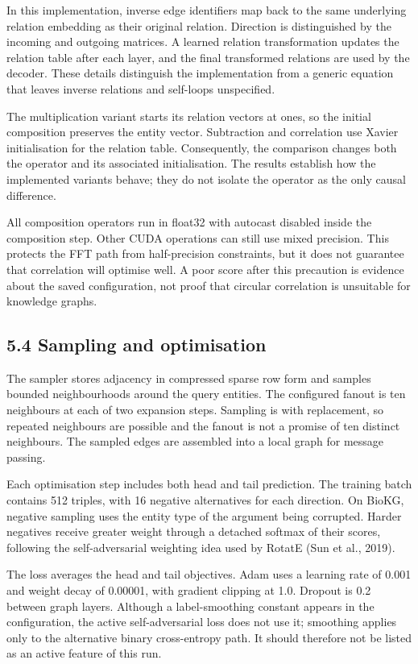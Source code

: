 \documentclass[11pt]{article}
\begin{document}
In this implementation, inverse edge identifiers map back to the same underlying relation embedding as their original relation. Direction is distinguished by the incoming and outgoing matrices. A learned relation transformation updates the relation table after each layer, and the final transformed relations are used by the decoder. These details distinguish the implementation from a generic equation that leaves inverse relations and self-loops unspecified.

The multiplication variant starts its relation vectors at ones, so the initial composition preserves the entity vector. Subtraction and correlation use Xavier initialisation for the relation table. Consequently, the comparison changes both the operator and its associated initialisation. The results establish how the implemented variants behave; they do not isolate the operator as the only causal difference.

All composition operators run in float32 with autocast disabled inside the composition step. Other CUDA operations can still use mixed precision. This protects the FFT path from half-precision constraints, but it does not guarantee that correlation will optimise well. A poor score after this precaution is evidence about the saved configuration, not proof that circular correlation is unsuitable for knowledge graphs.

\subsection*{5.4 Sampling and optimisation}
The sampler stores adjacency in compressed sparse row form and samples bounded neighbourhoods around the query entities. The configured fanout is ten neighbours at each of two expansion steps. Sampling is with replacement, so repeated neighbours are possible and the fanout is not a promise of ten distinct neighbours. The sampled edges are assembled into a local graph for message passing.

Each optimisation step includes both head and tail prediction. The training batch contains 512 triples, with 16 negative alternatives for each direction. On BioKG, negative sampling uses the entity type of the argument being corrupted. Harder negatives receive greater weight through a detached softmax of their scores, following the self-adversarial weighting idea used by RotatE (Sun et al., 2019).

The loss averages the head and tail objectives. Adam uses a learning rate of 0.001 and weight decay of 0.00001, with gradient clipping at 1.0. Dropout is 0.2 between graph layers. Although a label-smoothing constant appears in the configuration, the active self-adversarial loss does not use it; smoothing applies only to the alternative binary cross-entropy path. It should therefore not be listed as an active feature of this run.
\end{document}
